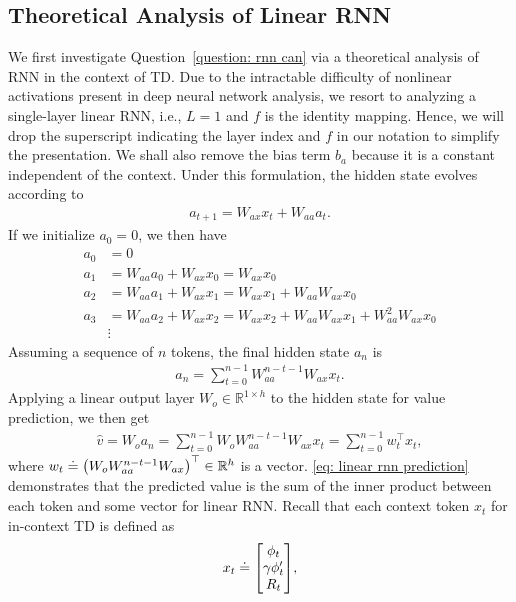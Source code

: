 \documentclass{article}
\newcommand{\R}{\mathbb{R}}
\begin{document}
\subsection{Theoretical Analysis of Linear RNN}
We first investigate Question~\ref{question: rnn can} via a theoretical analysis of RNN in the context of TD.
Due to the intractable difficulty of nonlinear activations present in deep neural network analysis, we resort to analyzing a single-layer linear RNN, i.e., $L=1$ and $f$ is the identity mapping.
Hence, we will drop the superscript indicating the layer index and $f$ in our notation to simplify the presentation.
We shall also remove the bias term $b_{a}$ because it is a constant independent of the context.
Under this formulation, the hidden state evolves according to
\begin{align}
    a_{t+1} = W_{ax} x_t + W_{aa} a_t.
\end{align}
If we initialize $a_0 = 0$, we then have
\begin{align}
    a_0 &= 0\\
    a_1 &= W_{aa} a_0 + W_{ax} x_0 = W_{ax} x_0\\
    a_2 &= W_{aa} a_1 + W_{ax} x_1 = W_{ax} x_1 + W_{aa}W_{ax} x_0\\
    a_3 &= W_{aa} a_2 + W_{ax} x_2 = W_{ax} x_2 + W_{aa}W_{ax} x_1 + W_{aa}^2W_{ax} x_0\\
    &\vdots
\end{align}
Assuming a sequence of $n$ tokens, the final hidden state $a_n$ is
\begin{align}
    a_n = \sum_{t=0}^{n-1} W_{aa}^{n-t-1} W_{ax} x_t.
\end{align}
Applying a linear output layer $W_o \in \R^{1 \times h}$ to the hidden state for value prediction, we then get
\begin{align}
\label{eq: linear rnn prediction}
    \hat{v} = W_o a_n = \sum_{t=0}^{n-1} W_o W_{aa}^{n-t-1} W_{ax} x_t
    = \sum_{t=0}^{n-1} w_t^\top x_t,
\end{align}
where $w_t \doteq \qty(W_o W_{aa}^{n-t-1} W_{ax})^\top \in \R^h$ is a vector.
\eqref{eq: linear rnn prediction} demonstrates that the predicted value is the sum of the inner product between each token and some vector for linear RNN.
Recall that each context token $x_t$ for in-context TD is defined as
\begin{align}
    x_t \doteq \mqty[\phi_t\\\gamma\phi'_t\\R_t],
\end{align}
\end{document}

